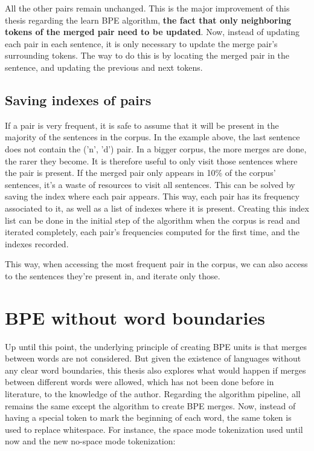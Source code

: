 All the other pairs remain unchanged. This is the major improvement of this thesis regarding the learn BPE algorithm, \textbf{the fact that only neighboring tokens of the merged pair need to be updated}. Now, instead of updating each pair in each sentence, it is only necessary to update the merge pair's surrounding tokens. The way to do this is by locating the merged pair in the sentence, and updating the previous and next tokens.

\subsection{Saving indexes of pairs}

If a pair is very frequent, it is safe to assume that it will be present in the majority of the sentences in the corpus. In the example above, the last sentence does not contain the ('n', 'd') pair. In a bigger corpus, the more merges are done, the rarer they become. It is therefore useful to only visit those sentences where the pair is present. If the merged pair only appears in 10\% of the corpus' sentences, it's a waste of resources to visit all sentences. This can be solved by saving the index where each pair appears. This way, each pair has its frequency associated to it, as well as a list of indexes where it is present. Creating this index list can be done in the initial step of the algorithm when the corpus is read and iterated completely, each pair's frequencies computed for the first time, and the indexes recorded.

This way, when accessing the most frequent pair in the corpus, we can also access to the sentences they're present in, and iterate only those.

\section{BPE without word boundaries}

Up until this point, the underlying principle of creating BPE units is that merges between words are not considered. But given the existence of languages without any clear word boundaries, this thesis also explores what would happen if merges between different words were allowed, which has not been done before in literature, to the knowledge of the author. Regarding the algorithm pipeline, all remains the same except the algorithm to create BPE merges. Now, instead of having a special token to mark the beginning of each word, the same token is used to replace whitespace. For instance, the space mode tokenization used until now and the new no-space mode tokenization:

